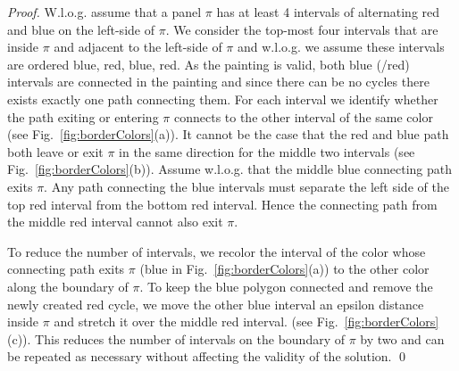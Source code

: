 \documentclass[runningheads]{llncs}
\begin{document}
\begin{proof}
W.l.o.g. assume that a panel $\pi$ has at least 4 intervals of alternating red and blue on the left-side of $\pi$.
We consider the top-most four intervals that are inside $\pi$ and adjacent to the left-side of $\pi$ and w.l.o.g. we assume these intervals are ordered blue, red, blue, red.
As the painting is valid, both blue (/red) intervals are connected in the painting and since there can be no cycles there exists exactly one path connecting them.
For each interval we identify whether the path exiting or entering $\pi$ connects to the other interval of the same color (see Fig.~\ref{fig:borderColors}(a)).
It cannot be the case that the red and blue path both leave or exit $\pi$ in the same direction for the middle two intervals (see Fig.~\ref{fig:borderColors}(b)).
Assume w.l.o.g. that the middle blue connecting path exits $\pi$.
Any path connecting the blue intervals must separate the left side of the top red interval from the bottom red interval.
Hence the connecting path from the middle red interval cannot also exit $\pi$.

To reduce the number of intervals, we recolor the interval of the color whose connecting path exits $\pi$ (blue in Fig.~\ref{fig:borderColors}(a)) to the other color along the boundary of $\pi$.
To keep the blue polygon connected and remove the newly created red cycle, we move the other blue interval an epsilon distance inside $\pi$ and stretch it over the middle red interval. (see Fig.~\ref{fig:borderColors}(c)).
This reduces the number of intervals on the boundary of $\pi$ by two and can be repeated as necessary without affecting the validity of the solution.
\hfill\qed
\end{proof}
\end{document}
